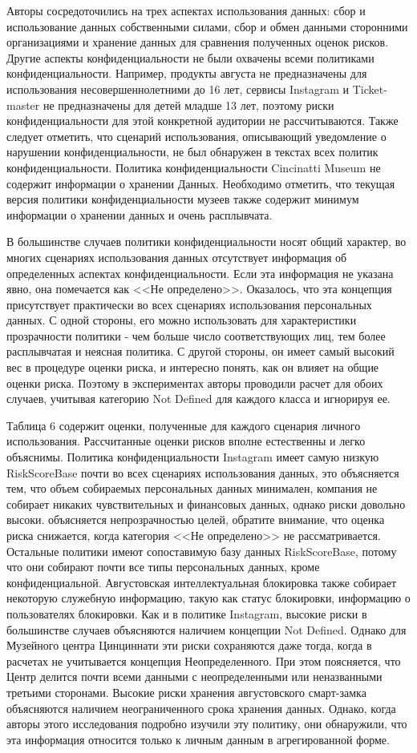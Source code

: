 \documentclass[../main]{subfiles}
\begin{document}
Авторы сосредоточились на трех аспектах использования данных: сбор и использование данных собственными силами, сбор и обмен данными сторонними организациями и хранение данных для сравнения полученных оценок рисков. Другие аспекты конфиденциальности не были охвачены всеми политиками конфиденциальности. Например, продукты августа не предназначены для использования несовершеннолетними до 16 лет, сервисы Instagram и Ticket-master не предназначены для детей младше 13 лет, поэтому риски конфиденциальности для этой конкретной аудитории не рассчитываются. Также следует отметить, что сценарий использования, описывающий уведомление о нарушении конфиденциальности, не был обнаружен в текстах всех политик конфиденциальности. Политика конфиденциальности Cincinatti Museum не содержит информации о хранении Данных. Необходимо отметить, что текущая версия политики конфиденциальности музеев также содержит минимум информации о хранении данных и очень расплывчата.

В большинстве случаев политики конфиденциальности носят общий характер, во многих сценариях использования данных отсутствует информация об определенных аспектах конфиденциальности. Если эта информация не указана явно, она помечается как <<Не определено>>. Оказалось, что эта концепция присутствует практически во всех сценариях использования персональных данных. С одной стороны, его можно использовать для характеристики прозрачности политики - чем больше число соответствующих лиц, тем более расплывчатая и неясная политика. С другой стороны, он имеет самый высокий вес в процедуре оценки риска, и интересно понять, как он влияет на общие оценки риска. Поэтому в экспериментах авторы проводили расчет для обоих случаев, учитывая категорию Not Defined для каждого класса и игнорируя ее.

Таблица 6 содержит оценки, полученные для каждого сценария личного использования. Рассчитанные оценки рисков вполне естественны и легко объяснимы. Политика конфиденциальности Instagram имеет самую низкую RiskScoreBase почти во всех сценариях использования данных, это объясняется тем, что объем собираемых персональных данных минимален, компания не собирает никаких чувствительных и финансовых данных, однако риски довольно высоки. объясняется непрозрачностью целей, обратите внимание, что оценка риска снижается, когда категория <<Не определено>> не рассматривается. Остальные политики имеют сопоставимую базу данных RiskScoreBase, потому что они собирают почти все типы персональных данных, кроме конфиденциальной. Августовская интеллектуальная блокировка также собирает некоторую служебную информацию, такую ​​как статус блокировки, информацию о пользователях блокировки. Как и в политике Instagram, высокие риски в большинстве случаев объясняются наличием концепции Not Defined. Однако для Музейного центра Цинциннати эти риски сохраняются даже тогда, когда в расчетах не учитывается концепция Неопределенного. При этом поясняется, что Центр делится почти всеми данными с неопределенными или неназванными третьими сторонами. Высокие риски хранения августовского смарт-замка объясняются наличием неограниченного срока хранения данных. Однако, когда авторы этого исследования подробно изучили эту политику, они обнаружили, что эта информация относится только к личным данным в агрегированной форме. 
\end{document}
